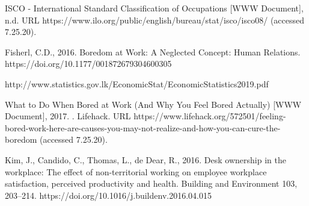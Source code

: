 \documentclass{article}
\begin{document}
	\newpage
	\begin{thebibliography}{9}
	ISCO - International Standard Classification of Occupations [WWW Document], n.d. URL https://www.ilo.org/public/english/bureau/stat/isco/isco08/ (accessed 7.25.20).
	
	Fisherl, C.D., 2016. Boredom at Work: A Neglected Concept: Human Relations. https://doi.org/10.1177/001872679304600305
	
	http://www.statistics.gov.lk/EconomicStat/EconomicStatistics2019.pdf
	
	What to Do When Bored at Work (And Why You Feel Bored Actually) [WWW Document], 2017. . Lifehack. URL https://www.lifehack.org/572501/feeling-bored-work-here-are-causes-you-may-not-realize-and-how-you-can-cure-the-boredom (accessed 7.25.20).
	
	Kim, J., Candido, C., Thomas, L., de Dear, R., 2016. Desk ownership in the workplace: The effect of non-territorial working on employee workplace satisfaction, perceived productivity and health. Building and Environment 103, 203–214. https://doi.org/10.1016/j.buildenv.2016.04.015
		
	\end{thebibliography}
	
\end{document}
